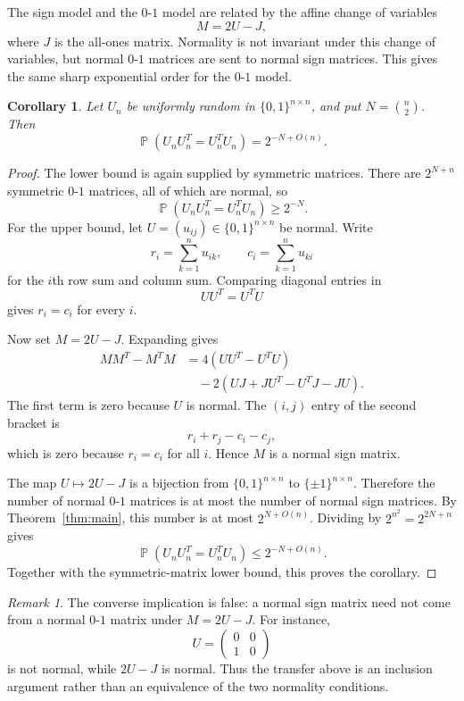 \documentclass[11pt]{amsart}
\newtheorem{corollary}[theorem]{Corollary}
\theoremstyle{remark}
\newtheorem{remark}[theorem]{Remark}
\numberwithin{equation}{section}
\DeclareMathOperator{\probb}{\mathbb P}
\begin{document}
The sign model and the $0$-$1$ model are related by the affine change of variables
\[
        M=2U-J,
\]
where $J$ is the all-ones matrix.  Normality is not invariant under this change of variables, but normal $0$-$1$ matrices are sent to normal sign matrices.  This gives the same sharp exponential order for the $0$-$1$ model.

\begin{corollary}\label{cor:zero-one}
Let $U_n$ be uniformly random in $\{0,1\}^{n\times n}$, and put $N=\binom n2$.  Then
\[
        \probb(U_nU_n^T=U_n^TU_n)=2^{-N+O(n)}.
\]
\end{corollary}

\begin{proof}
The lower bound is again supplied by symmetric matrices.  There are $2^{N+n}$ symmetric $0$-$1$ matrices, all of which are normal, so
\[
        \probb(U_nU_n^T=U_n^TU_n)\geq 2^{-N}.
\]
For the upper bound, let $U=(u_{ij})\in\{0,1\}^{n\times n}$ be normal.  Write
\[
        r_i=\sum_{k=1}^n u_{ik},\qquad c_i=\sum_{k=1}^n u_{ki}
\]
for the $i$th row sum and column sum.  Comparing diagonal entries in
\[
        UU^T=U^TU
\]
gives $r_i=c_i$ for every $i$.

Now set $M=2U-J$.  Expanding gives
\begin{align*}
        MM^T-M^TM
        &=4(UU^T-U^TU)  \\
        &\quad -2(UJ+JU^T-U^TJ-JU).
\end{align*}
The first term is zero because $U$ is normal.  The $(i,j)$ entry of the second bracket is
\[
        r_i+r_j-c_i-c_j,
\]
which is zero because $r_i=c_i$ for all $i$.  Hence $M$ is a normal sign matrix.

The map $U\mapsto 2U-J$ is a bijection from $\{0,1\}^{n\times n}$ to $\{\pm1\}^{n\times n}$.  Therefore the number of normal $0$-$1$ matrices is at most the number of normal sign matrices.  By Theorem~\ref{thm:main}, this number is at most $2^{N+O(n)}$.  Dividing by $2^{n^2}=2^{2N+n}$ gives
\[
        \probb(U_nU_n^T=U_n^TU_n)\leq 2^{-N+O(n)}.
\]
Together with the symmetric-matrix lower bound, this proves the corollary.
\end{proof}

\begin{remark}
The converse implication is false: a normal sign matrix need not come from a normal $0$-$1$ matrix under $M=2U-J$.  For instance,
\[
        U=\begin{pmatrix}0&0\\1&0\end{pmatrix}
\]
is not normal, while $2U-J$ is normal.  Thus the transfer above is an inclusion argument rather than an equivalence of the two normality conditions.
\end{remark}
\end{document}
